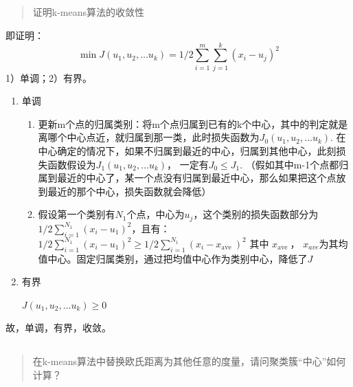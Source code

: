 \documentclass[UTF8,a4paper,AutoFakeBold,AutoFakeSlant]{article}
\begin{document}
\subsection{}

\begin{quotation}
  \item 证明k-means算法的收敛性
\end{quotation}

即证明：
\begin{equation*}
  \min J\left(u_{1}, u_{2}, \ldots u_{k}\right)=1 / 2 \sum_{i=1}^{m} \sum_{j=1}^{k}\left(x_{i}-u_{j}\right)^{2}
\end{equation*}
1）单调；2）有界。

\begin{enumerate}
  \item 单调
        \begin{enumerate}
          \item 更新m个点的归属类别：将m个点归属到已有的k个中心，其中的判定就是离哪个中心点近，就归属到那一类，此时损失函数为$ J_0\left(u_{1}, u_{2}, \ldots u_{k}\right) $.
                在中心确定的情况下，如果不归属到最近的中心，归属到其他中心，此刻损失函数假设为$ J_1\left(u_{1}, u_{2}, \ldots u_{k}\right) $，
                一定有$ J_0 \leq J_1 $. （假如其中m-1个点都归属到最近的中心了，某一个点没有归属到最近中心，那么如果把这个点放到最近的那个中心，损失函数就会降低）
          \item 假设第一个类别有$N_1$个点，中心为$u_j$，这个类别的损失函数部分为$1 / 2 \sum_{i=1}^{N_{1}}\left(x_{i}-u_{1}\right)^{2}$，且有：
                $ 1 / 2 \sum_{i=1}^{N_{1}}\left(x_{i}-u_{1}\right)^{2} \geq 1 / 2 \sum_{i=1}^{N_{1}}\left(x_{i}-x_{\text {ave }}\right)^{2} \text { 其中 } x_{\text {ave }} $，
                $x_{ave}$为其均值中心。固定归属类别，通过把均值中心作为类别中心，降低了$J$
        \end{enumerate}
  \item 有界

        $J\left(u_{1}, u_{2}, \ldots u_{k}\right) \geq 0$
\end{enumerate}
故，单调，有界，收敛。



\subsection{}

\begin{quotation}
  在k-means算法中替换欧氏距离为其他任意的度量，请问聚类簇“中心”如何计算？
\end{quotation}
\end{document}
